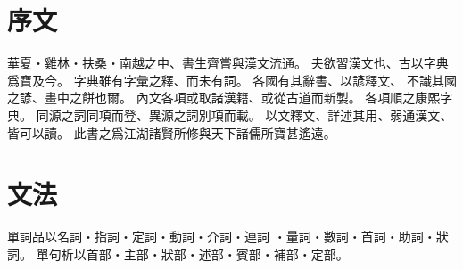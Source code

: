 \chapter*{序文}
華夏・雞林・扶桑・南越之中、書生齊嘗與漢文流通。
夫欲習漢文也、古以字典爲寶及今。
字典雖有字彙之釋、而未有詞。
各國有其辭書、以諺釋文、
不識其國之諺、畫中之餅也爾。
內文各項或取諸漢籍、或從古道而新製。
各項順之康熙字典。
同源之詞同項而登、異源之詞別項而載。
以文釋文、詳述其用、弱通漢文、皆可以讀。
此書之爲江湖諸賢所修與天下諸儒所寶甚遙遠。
\chapter*{文法}
單詞品以名詞・指詞・定詞・動詞・介詞・連詞
・量詞・數詞・首詞・助詞・狀詞。
單句析以首部・主部・狀部・述部・賓部・補部・定部。
